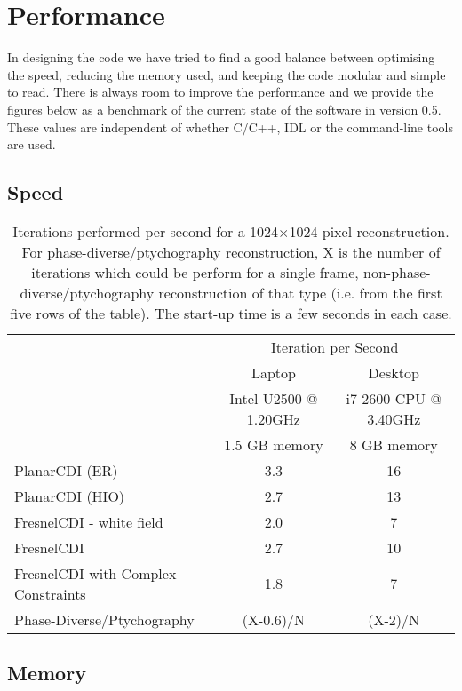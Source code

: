 \documentclass[]{nadia}
\def\ver{0.5}
\begin{document}
\newpage

\section{Performance}

In designing the code we have tried to find a good balance between
optimising the speed, reducing the memory used, and keeping the code
modular and simple to read. There is always room to improve the
performance and we provide the figures below as a benchmark of the
current state of the software in version \ver. These values are
independent of whether C/C++, IDL or the command-line tools are used.

\subsection{Speed}

\begin{table}[h!]
\begin{tabular}[h!]{lcc}
\toprule
   & \multicolumn{2}{c}{Iteration per Second} \\
   & Laptop & Desktop \\
   & Intel U2500 @ 1.20GHz & i7-2600 CPU @ 3.40GHz \\
   & 1.5 GB memory & 8 GB memory\\

\midrule
PlanarCDI (ER) & 3.3  &  16 \\
PlanarCDI (HIO) & 2.7 & 13 \\
FresnelCDI - white field & 2.0 & 7 \\
FresnelCDI & 2.7 & 10 \\
FresnelCDI with Complex Constraints & 1.8 & 7 \\
Phase-Diverse/Ptychography & (X-0.6)/N  & (X-2)/N  \\
\bottomrule
\end{tabular}

\caption{\label{table:speed} Iterations performed per second for a
  1024$\times$1024 pixel reconstruction. For
  phase-diverse/ptychography reconstruction, X is the number of
  iterations which could be perform for a single frame,
  non-phase-diverse/ptychography reconstruction of that type
  (i.e. from the first five rows of the table). The start-up time is a
  few seconds in each case. }
\end{table}

\subsection{Memory}
\end{document}
